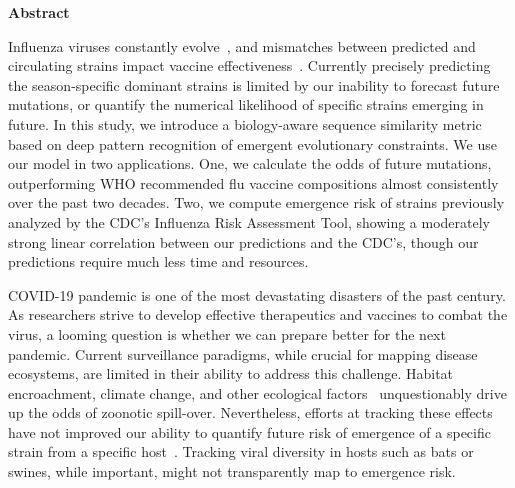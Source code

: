 \documentclass[onecolumn, compsoc,10pt]{IEEEtran}
\begin{document}
 
 
\maketitle

 
\begin{center}
    \textbf{Abstract}
\end{center}

{\color{MediumBlue}
  {\bf \sffamily \fontsize{10}{12}\selectfont \noindent
    
Influenza viruses constantly evolve~\cite{dos2016influenza}, and mismatches between predicted and circulating strains impact vaccine effectiveness~\cite{tricco2013comparing}. Currently precisely predicting the season-specific dominant strains is limited by our inability to forecast future mutations, or quantify the numerical likelihood of specific strains emerging in future. In this study, we introduce a biology-aware sequence similarity metric based on deep pattern recognition of emergent evolutionary constraints. We use our model in two applications. One, we calculate the odds of future mutations, outperforming WHO recommended flu vaccine compositions almost consistently over the past two decades. Two, we compute emergence risk of strains previously analyzed by the CDC's Influenza Risk Assessment Tool, showing a moderately strong linear correlation between our predictions and the CDC's, though our predictions require much less time and resources.}
}

\vspace{10pt}
  
 COVID-19 pandemic is one of the most devastating disasters of the past century. As researchers strive to develop effective therapeutics and vaccines to combat the \hcov virus, a looming question is whether we can prepare better for the next pandemic. Current surveillance paradigms, while crucial for mapping disease ecosystems, are limited in their ability to address this challenge. Habitat encroachment, climate change, and other ecological factors~\cite{rulli2017nexus,chua2002anthropogenic,childs2004zoonotic} unquestionably drive up the odds of zoonotic spill-over. Nevertheless, efforts at tracking these effects have not improved our ability to quantify future risk of emergence of a specific strain from a specific host~\cite{fair2019viral}. Tracking viral diversity in hosts such as bats or swines, while important, might not transparently map to emergence risk.
\end{document}
